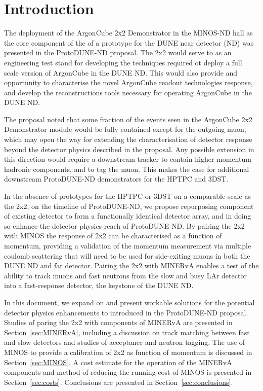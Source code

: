 \section{Introduction}
\label{sec:introduction}

The deployment of the ArgonCube 2x2 Demonstrator in the MINOS-ND hall as the core component of the of a prototype for the DUNE near detector (ND) was presented in the ProtoDUNE-ND proposal. The 2x2 would serve to as an engineering test stand for developing the techniques required ot deploy a full scale version of ArgonCube in the DUNE ND. This would also provide and opportunity to characterise the novel ArgonCube readout technologies response, and develop the reconstructions tools necessary for operating ArgonCube in the DUNE ND.      

The proposal noted that some fraction of the events seen in the ArgonCube 2x2 Demonstrator module would be fully contained except for the outgoing muon, which may open the way for extending the characterisation of detector response beyond the detector physics described in the proposal. 
Any possible extension in this direction would require a downstream tracker to contain higher momentum hadronic components, and to tag the muon. 
This makes the case for additional downstream ProtoDUNE-ND demonstrators for the HPTPC and 3DST.

In the absence of prototypes for the HPTPC or 3DST on a comparable scale as the 2x2, on the timeline of ProtoDUNE-ND, we propose repurposing component of existing detector to form a functionally identical detector array, and in doing so enhance the detector physics reach of ProtoDUNE-ND.      
By pairing the 2x2 with MINOS the response of 2x2 can be characterised as a function of momentum, providing a validation of the momentum measurement via multiple coulomb scattering that will need to be used for side-exiting muons in both the DUNE ND and far detector.
Pairing the 2x2 with MINERvA enables a test of the ability to track muons and fast neutrons from the slow and busy LAr detector into a fast-response detector, the keystone of the DUNE ND.

In this document, we expand on and present workable solutions for the potential detector physics enhancements to introduced in the ProtoDUNE-ND proposal. Studies of paring the 2x2 with components of MINERvA are presented in Section~\ref{sec:MINERvA}, including a discussion on track matching between fast and slow detectors and studies of acceptance and neutron tagging. The use of MINOS to provide a calibration of 2x2 as function of momentum is discussed in Section~\ref{sec:MINOS}. A cost estimate for the operation of the MINERvA components and method of reducing the running cost of MINOS is presented in Section~\ref{sec:costs}. Conclusions are presented in Section~\ref{sec:conclusions}.

